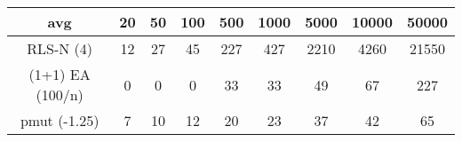 \begin{tabular}[h]{ccccccccc}
avg&20&50&100&500&1000&5000&10000&50000\\\hline
RLS-N (4)&12&27&45&227&427&2210&4260&21550\\
(1+1) EA (100/n)&0&0&0&33&33&49&67&227\\
pmut (-1.25)&7&10&12&20&23&37&42&65\\
\end{tabular}
